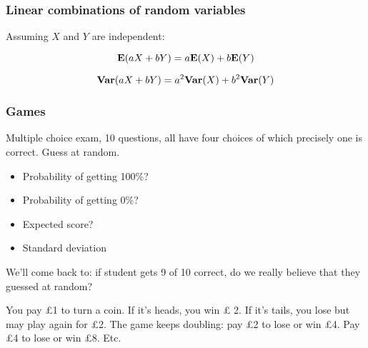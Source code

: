 \begin{frame}
  \frametitle{Linear combinations of random variables}

  Assuming $X$ and $Y$ are independent:
  
  \begin{displaymath}
    \mathbf{E}(aX+bY) = a\mathbf{E}(X) + b\mathbf{E}(Y)
  \end{displaymath}

  \begin{displaymath}
    \mathbf{Var}(aX+bY) = a^2\mathbf{Var}(X) + b^2\mathbf{Var}(Y)
  \end{displaymath}
\end{frame}

\begin{frame}
  \frametitle{Games}

   {
    Multiple choice exam, 10 questions, all have four choices of which
    precisely one is correct.  Guess at random.
    \begin{itemize}
    \item Probability of getting 100\%? 
    \item Probability of getting 0\%? 
    \item Expected score? 
    \item Standard deviation 
    \end{itemize}
    We'll come back to: if student gets 9 of 10 correct, do we really
    believe that they guessed at random?
  }

   {
    You pay \pounds 1 to turn a coin.  If it's heads, you win \pounds
    2.  If it's tails, you lose but may play again for \pounds 2.  The
    game keeps doubling: pay \pounds 2 to lose or win \pounds 4.  Pay
    \pounds 4 to lose or win \pounds 8.  Etc.
  }

\end{frame}

